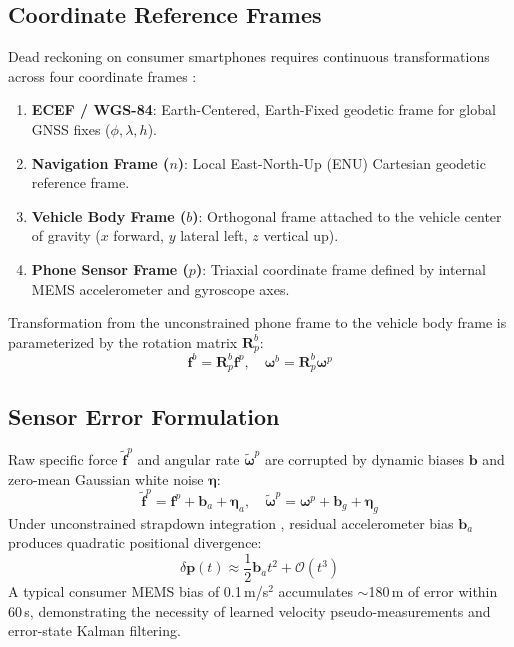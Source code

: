 \documentclass[conference]{IEEEtran}
\begin{document}
\subsection{Coordinate Reference Frames}
Dead reckoning on consumer smartphones requires continuous transformations across four coordinate frames \cite{sola2017}:
\begin{enumerate}
\item \textbf{ECEF / WGS-84}: Earth-Centered, Earth-Fixed geodetic frame for global GNSS fixes ($\phi, \lambda, h$).
\item \textbf{Navigation Frame ($n$)}: Local East-North-Up (ENU) Cartesian geodetic reference frame.
\item \textbf{Vehicle Body Frame ($b$)}: Orthogonal frame attached to the vehicle center of gravity ($x$ forward, $y$ lateral left, $z$ vertical up).
\item \textbf{Phone Sensor Frame ($p$)}: Triaxial coordinate frame defined by internal MEMS accelerometer and gyroscope axes.
\end{enumerate}
Transformation from the unconstrained phone frame to the vehicle body frame is parameterized by the rotation matrix $\mathbf{R}_p^b$:
\begin{equation}
\mathbf{f}^b = \mathbf{R}_p^b \mathbf{f}^p, \quad \boldsymbol{\omega}^b = \mathbf{R}_p^b \boldsymbol{\omega}^p
\end{equation}

\subsection{Sensor Error Formulation}
Raw specific force $\tilde{\mathbf{f}}^p$ and angular rate $\tilde{\boldsymbol{\omega}}^p$ are corrupted by dynamic biases $\mathbf{b}$ and zero-mean Gaussian white noise $\boldsymbol{\eta}$:
\begin{equation}
\tilde{\mathbf{f}}^p = \mathbf{f}^p + \mathbf{b}_a + \boldsymbol{\eta}_a, \quad \tilde{\boldsymbol{\omega}}^p = \boldsymbol{\omega}^p + \mathbf{b}_g + \boldsymbol{\eta}_g
\end{equation}
Under unconstrained strapdown integration \cite{brossard2020, dissanayake2001}, residual accelerometer bias $\mathbf{b}_a$ produces quadratic positional divergence:
\begin{equation}
\delta \mathbf{p}(t) \approx \frac{1}{2}\mathbf{b}_a t^2 + \mathcal{O}(t^3)
\end{equation}
A typical consumer MEMS bias of 0.1\,m/s$^2$ accumulates $\sim$180\,m of error within 60\,s, demonstrating the necessity of learned velocity pseudo-measurements and error-state Kalman filtering.
\end{document}
